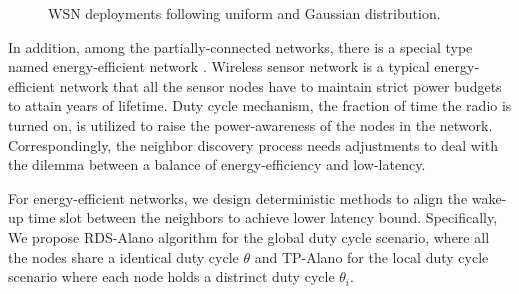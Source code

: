  
 \begin{figure}[!t]
\centering
{}
\vspace{0.03in}
\caption{WSN deployments following uniform and Gaussian distribution.}
\label{distribution}
\end{figure}


In addition, among the partially-connected networks, there is a special 
type named energy-efficient network \cite{jones2001survey}.
Wireless sensor network is a typical energy-efficient network that all the sensor nodes have to maintain 
strict power budgets to attain years of lifetime\cite{dunkels2011contikimac}.
Duty cycle mechanism, the fraction of time the radio is turned on, is 
utilized to raise the power-awareness of the nodes in the network.
Correspondingly, the neighbor discovery process 
needs adjustments to deal with the dilemma between 
a balance of energy-efficiency and low-latency.


For energy-efficient networks, we design deterministic methods
to align the wake-up time slot between the neighbors to achieve lower latency bound.
Specifically, We propose RDS-Alano algorithm for the global duty cycle scenario, where 
all the nodes share a identical duty cycle $\theta$ and TP-Alano for the
local duty cycle scenario where each node holds a distrinct duty cycle $\theta_i$. 


